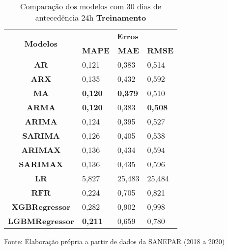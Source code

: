 \begin{table}[H]
	\centering
	\caption{Comparação dos modelos com 30 dias de antecedência 24h \textbf{Treinamento} }\label{tb:60-24trn}
	\begin{tabular}{@{}clll@{}}
		\toprule
		\multirow{2}{*}{\textbf{Modelos}} & \multicolumn{3}{c}{\textbf{Erros}}                                                                       \\ \cmidrule(l){2-4} 
		& \multicolumn{1}{c}{\textbf{MAPE}} & \multicolumn{1}{c}{\textbf{MAE}} & \multicolumn{1}{c}{\textbf{RMSE}} \\ \hline
\textbf{AR}                       & 0,121                             & 0,383                            & 0,514                             \\
\textbf{ARX}                      & 0,135                             & 0,432                            & 0,592                             \\
\textbf{MA}                       & \textbf{0,120}                             & \textbf{0,379 }                           & 0,510                             \\
\textbf{ARMA}                     &\textbf{ 0,120}                             & 0,383                            & \textbf{0,508}                             \\
\textbf{ARIMA}                    & 0,124                             & 0,395                            & 0,527                             \\
\textbf{SARIMA}                   & 0,126                             & 0,405                            & 0,538                             \\
\textbf{ARIMAX}                   & 0,136                             & 0,434                            & 0,594                             \\
\textbf{SARIMAX}                  & 0,136                             & 0,435                            & 0,596                             \\
\textbf{LR}                       & 5,827                             & 25,483                           & 25,484                            \\
\textbf{RFR}                      & 0,224                             & 0,705                            & 0,821                             \\
\textbf{XGBRegressor}             & 0,282                             & 0,902                            & 0,998                             \\
\textbf{LGBMRegressor}            & \textbf{0,211}                             & 0,659                            & 0,780                             \\ \bottomrule
	\end{tabular}

Fonte: Elaboração própria a partir de dados da SANEPAR (2018 a 2020)
\end{table}

